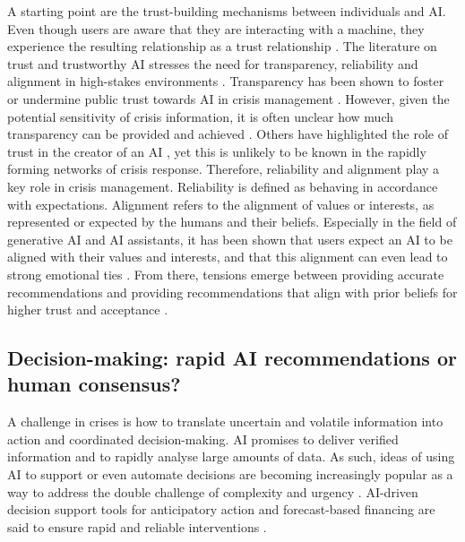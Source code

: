 \documentclass[pdflatex,sn-basic]{sn-jnl}
\begin{document}
A starting point are the trust-building mechanisms between individuals and AI. Even though users are aware that they are interacting with a machine, they experience the resulting relationship as a trust relationship \citep{manzini2024should}. The literature on trust and trustworthy AI stresses the need for transparency, reliability and alignment in high-stakes environments \citep{glikson2020human,lee2004trust}. Transparency has been shown to foster or undermine public trust towards AI in crisis management \citep{steinbrink2024transparency,visave2025transparency}. However, given the potential sensitivity of crisis information, it is often unclear how much transparency can be provided and achieved \citep{steinbrink2024transparency}. Others have highlighted the role of trust in the creator of an AI \citep{saffarizadeh2024relationship}, yet this is unlikely to be known in the rapidly forming networks of crisis response. Therefore, reliability and alignment play a key role in crisis management. Reliability is defined as behaving in accordance with expectations. Alignment refers to the alignment of values or interests, as represented or expected by the humans and their beliefs. Especially in the field of generative AI and AI assistants, it has been shown that users expect an AI to be aligned with their values and interests, and that this alignment can even lead to strong emotional ties \citep{kaplan2023trust,manzini2024should}. From there, tensions emerge between providing accurate recommendations and providing recommendations that align with prior beliefs for higher trust and acceptance \citep{ekstrom2022self,sharma2024generative}.

\subsection{Decision-making: rapid AI recommendations or human consensus?}\label{sec:decision}

A challenge in crises is how to translate uncertain and volatile information into action and coordinated decision-making. AI promises to deliver verified information \citep{zhao2025tailoring} and to rapidly analyse large amounts of data. As such, ideas of using AI to support or even automate decisions are becoming increasingly popular as a way to address the double challenge of complexity and urgency \citep{comes2024ai}. AI-driven decision support tools for anticipatory action and forecast-based financing are said to ensure rapid and reliable interventions \citep{thalheimer2022role}.
\end{document}
